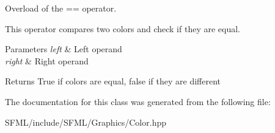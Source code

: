 Overload of the == operator. 

This operator compares two colors and check if they are equal.


\begin{DoxyParams}{Parameters}
{\em left} & Left operand \\
\hline
{\em right} & Right operand\\
\hline
\end{DoxyParams}
\begin{DoxyReturn}{Returns}
True if colors are equal, false if they are different \begin{DoxyVerb}\end{DoxyVerb}
 
\end{DoxyReturn}


The documentation for this class was generated from the following file\+:\begin{DoxyCompactItemize}
\item 
S\+F\+M\+L/include/\+S\+F\+M\+L/\+Graphics/Color.\+hpp\end{DoxyCompactItemize}
